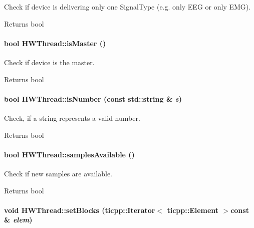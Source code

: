Check if device is delivering only one SignalType (e.g. only EEG or only EMG). \begin{DoxyReturn}{Returns}
bool 
\end{DoxyReturn}
\hypertarget{class_h_w_thread_a0ee653e71f6ac92c96d5d9df2bd986e1}{
\paragraph[{isMaster}]{\setlength{\rightskip}{0pt plus 5cm}bool HWThread::isMaster ()}\hfill}
\label{class_h_w_thread_a0ee653e71f6ac92c96d5d9df2bd986e1}


Check if device is the master. \begin{DoxyReturn}{Returns}
bool 
\end{DoxyReturn}
\hypertarget{class_h_w_thread_afc7da1ef263177f3108dcc318208dc60}{
\paragraph[{isNumber}]{\setlength{\rightskip}{0pt plus 5cm}bool HWThread::isNumber (const std::string \& {\em s})}\hfill}
\label{class_h_w_thread_afc7da1ef263177f3108dcc318208dc60}


Check, if a string represents a valid number. \begin{DoxyReturn}{Returns}
bool 
\end{DoxyReturn}
\hypertarget{class_h_w_thread_a240b66ff60434938ca89690cd542dc58}{
\paragraph[{samplesAvailable}]{\setlength{\rightskip}{0pt plus 5cm}bool HWThread::samplesAvailable ()}\hfill}
\label{class_h_w_thread_a240b66ff60434938ca89690cd542dc58}


Check if new samples are available. \begin{DoxyReturn}{Returns}
bool 
\end{DoxyReturn}
\hypertarget{class_h_w_thread_a8c3dada5e55e8e29eadf41e2097ec80a}{
\paragraph[{setBlocks}]{\setlength{\rightskip}{0pt plus 5cm}void HWThread::setBlocks (ticpp::Iterator$<$ ticpp::Element $>$const \& {\em elem})}\hfill}
\label{class_h_w_thread_a8c3dada5e55e8e29eadf41e2097ec80a}


